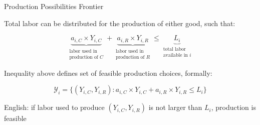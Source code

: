 \documentclass[notes,11pt, aspectratio=169, xcolor=table]{beamer}
\newenvironment{wideitemize}{\itemize\addtolength{\itemsep}{10pt}}{\enditemize}
\begin{document}
\begin{frame}{Production Possibilities Frontier}
\begin{wideitemize}
        \item Total labor can be distributed for the production of either good, such that:

        \begin{equation*}
            \underbrace{a_{i,C} \times Y_{i,C}}_{\substack{\text{labor used in} \\ \text{production of } C}} + \underbrace{a_{i,R} \times Y_{i,R}}_{\substack{\text{labor used in} \\ \text{production of } R}} \le \underbrace{L_i}_{\substack{\text{total labor} \\ \text{available in } i}}
        \end{equation*}

        \item Inequality above defines set of feasible production choices, formally:

        \begin{equation*}
            \mathcal{Y}_{i} = \{ (Y_{i,C}, Y_{i,R}) : a_{i,C} \times Y_{i,C} + a_{i,R} \times Y_{i,R} \le L_i \}
        \end{equation*}
        
        \item English: if labor used to produce $(Y_{i,C}, Y_{i,R})$ is not larger than $L_i$, production is feasible
    \end{wideitemize}
\end{frame}
\end{document}
